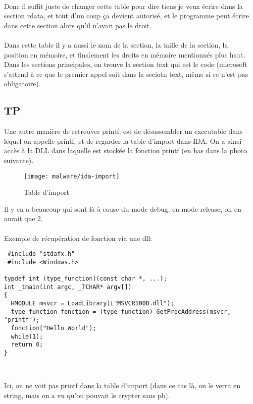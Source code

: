 \documentclass[a4paper,10pt]{article}
\begin{document}
\paragraph*{}
Donc il suffit juste de changer cette table pour dire tiens je veux écrire dans la section rdata, et tout d'un coup ça devient autorisé, et le programme peut écrire dans cette section alors qu'il n'avait pas le droit.

\paragraph*{}
Dans cette table il y a aussi le nom de la section, la taille de la section, la position en mémoire, et finalement les droits en mémoire mentionnés plus haut. Dans les sections principales, on trouve la section text qui est le code (microsoft s'attend à ce que le premier appel soit dans la seciotn text, même si ce n'est pas obligatoire).

\subsection{TP}
Une autre manière de retrouver printf, est de désassembler un executable dans lequel on appelle printf, et de regarder la table d'import dans IDA. On a ainsi accès à la DLL dans laquelle est stockée la fonction printf (en bas dans la photo suivante).


\begin{figure}[h!]
 \centering	
 \texttt{[image: malware/ida-import]}
 \caption{Table d'import}
\end{figure}
Il y en a beaucoup qui sont là à cause du mode debug, en mode release, on en aurait que 2.

\paragraph*{}
Exemple de récupération de fonction via une dll:
\begin{lstlisting}
 #include "stdafx.h"
 #include <Windows.h>

typdef int (type_function)(const char *, ...);
int _tmain(int argc, _TCHAR* argv[])
{
  HMODULE msvcr = LoadLibrary(L"MSVCR100D.dll");
  type_function fonction = (type_function) GetProcAddress(msvcr, "printf");
  fonction("Hello World");
  while(1);
  return 0;
}
  
 
\end{lstlisting}

Ici, on ne voit pas printf dans la table d'import (dans ce cas là, on le verra en string, mais on a vu qu'on pouvait le crypter sans pb).
\end{document}
